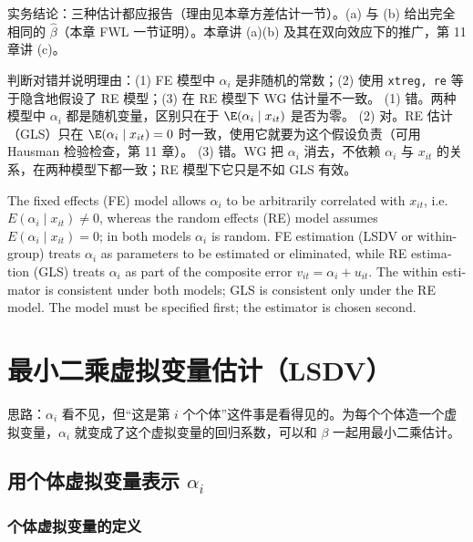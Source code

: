 实务结论：三种估计都应报告（理由见本章方差估计一节）。(a) 与 (b) 给出完全相同的 $\hat\beta$（本章 FWL 一节证明）。本章讲 (a)(b) 及其在双向效应下的推广，第 11 章讲 (c)。

\begin{prac}[模型还是估计]\label{pr:U10a-modelest}
判断对错并说明理由：(1) FE 模型中 $\alpha_i$ 是非随机的常数；(2) 使用 \texttt{xtreg, re} 等于隐含地假设了 RE 模型；(3) 在 RE 模型下 WG 估计量不一致。
\answer
(1) 错。两种模型中 $\alpha_i$ 都是随机变量，区别只在于 $\E(\alpha_i\mid x_{it})$ 是否为零。
(2) 对。RE 估计（GLS）只在 $\E(\alpha_i\mid x_{it})=0$ 时一致，使用它就要为这个假设负责（可用 Hausman 检验检查，第 11 章）。
(3) 错。WG 把 $\alpha_i$ 消去，不依赖 $\alpha_i$ 与 $x_{it}$ 的关系，在两种模型下都一致；RE 模型下它只是不如 GLS 有效。
\end{prac}

\begin{english}
The fixed effects (FE) model allows $\alpha_i$ to be arbitrarily correlated with $x_{it}$, i.e.\ $E(\alpha_i\mid x_{it})\neq0$, whereas the random effects (RE) model assumes $E(\alpha_i\mid x_{it})=0$; in both models $\alpha_i$ is random. FE estimation (LSDV or within-group) treats $\alpha_i$ as parameters to be estimated or eliminated, while RE estimation (GLS) treats $\alpha_i$ as part of the composite error $v_{it}=\alpha_i+u_{it}$. The within estimator is consistent under both models; GLS is consistent only under the RE model. The model must be specified first; the estimator is chosen second.
\end{english}

\section{最小二乘虚拟变量估计（LSDV）}\label{sec:U10a-lsdv}

思路：$\alpha_i$ 看不见，但“这是第 $i$ 个个体”这件事是看得见的。为每个个体造一个虚拟变量，$\alpha_i$ 就变成了这个虚拟变量的回归系数，可以和 $\beta$ 一起用最小二乘估计。

\subsection{用个体虚拟变量表示 \texorpdfstring{$\alpha_i$}{alpha\_i}}

\subsubsection{个体虚拟变量的定义}

